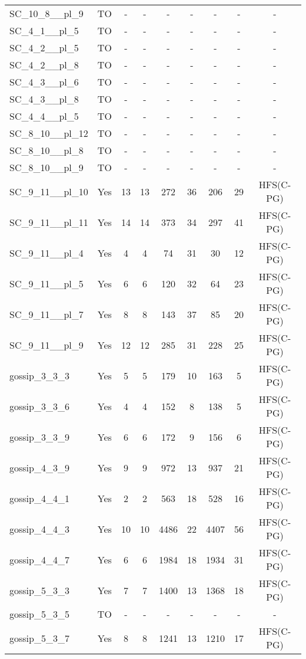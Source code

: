 \documentclass{article}
\begin{document}
\begin{tabular}{lcccccccc}
SC\_10\_8\_\_pl\_9 & TO & - & - & - & - & - & - & - \\
SC\_4\_1\_\_pl\_5 & TO & - & - & - & - & - & - & - \\
SC\_4\_2\_\_pl\_5 & TO & - & - & - & - & - & - & - \\
SC\_4\_2\_\_pl\_8 & TO & - & - & - & - & - & - & - \\
SC\_4\_3\_\_pl\_6 & TO & - & - & - & - & - & - & - \\
SC\_4\_3\_\_pl\_8 & TO & - & - & - & - & - & - & - \\
SC\_4\_4\_\_pl\_5 & TO & - & - & - & - & - & - & - \\
SC\_8\_10\_\_pl\_12 & TO & - & - & - & - & - & - & - \\
SC\_8\_10\_\_pl\_8 & TO & - & - & - & - & - & - & - \\
SC\_8\_10\_\_pl\_9 & TO & - & - & - & - & - & - & - \\
SC\_9\_11\_\_pl\_10 & Yes & 13 & 13 & 272 & 36 & 206 & 29 & HFS(C-PG) \\
SC\_9\_11\_\_pl\_11 & Yes & 14 & 14 & 373 & 34 & 297 & 41 & HFS(C-PG) \\
SC\_9\_11\_\_pl\_4 & Yes & 4 & 4 & 74 & 31 & 30 & 12 & HFS(C-PG) \\
SC\_9\_11\_\_pl\_5 & Yes & 6 & 6 & 120 & 32 & 64 & 23 & HFS(C-PG) \\
SC\_9\_11\_\_pl\_7 & Yes & 8 & 8 & 143 & 37 & 85 & 20 & HFS(C-PG) \\
SC\_9\_11\_\_pl\_9 & Yes & 12 & 12 & 285 & 31 & 228 & 25 & HFS(C-PG) \\
gossip\_3\_3\_3 & Yes & 5 & 5 & 179 & 10 & 163 & 5 & HFS(C-PG) \\
gossip\_3\_3\_6 & Yes & 4 & 4 & 152 & 8 & 138 & 5 & HFS(C-PG) \\
gossip\_3\_3\_9 & Yes & 6 & 6 & 172 & 9 & 156 & 6 & HFS(C-PG) \\
gossip\_4\_3\_9 & Yes & 9 & 9 & 972 & 13 & 937 & 21 & HFS(C-PG) \\
gossip\_4\_4\_1 & Yes & 2 & 2 & 563 & 18 & 528 & 16 & HFS(C-PG) \\
gossip\_4\_4\_3 & Yes & 10 & 10 & 4486 & 22 & 4407 & 56 & HFS(C-PG) \\
gossip\_4\_4\_7 & Yes & 6 & 6 & 1984 & 18 & 1934 & 31 & HFS(C-PG) \\
gossip\_5\_3\_3 & Yes & 7 & 7 & 1400 & 13 & 1368 & 18 & HFS(C-PG) \\
gossip\_5\_3\_5 & TO & - & - & - & - & - & - & - \\
gossip\_5\_3\_7 & Yes & 8 & 8 & 1241 & 13 & 1210 & 17 & HFS(C-PG) \\

\end{tabular}
\end{document}
